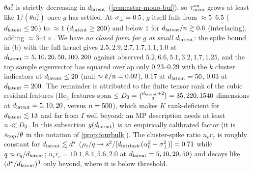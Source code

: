 \begin{proposition}
$\theta a_*^2$ is strictly decreasing in $d_{\mathrm{latent}}$ (\cref{rem:astar-mono-buf}), so $\tau_{\mathrm{mem}}^{\rm on}$ grows at least like $1/(\theta a_*^2)$ once $g$ has settled. At $\sigma_{\perp}=0.5$, $g$ itself falls from $\approx5$--$6.5$ ($d_{\mathrm{latent}}\le20$) to $\approx1$ ($d_{\mathrm{latent}}\ge200$) and below $1$ for $d_{\mathrm{latent}}/n\gtrsim0.6$ (interlacing), adding $\approx3$--$4\times$. We have \emph{no closed form for $g$ at small $d_{\mathrm{latent}}$}: the spike bound in (b) with the full kernel gives $2.5,2.9,2.7,1.7,1.1,1.0$ at $d_{\mathrm{latent}}=5,10,20,50,100,200$ against observed $5.2,6.6,5.1,3.2,1.7,1.25$, and the top sample eigenvector has squared overlap only $0.23$--$0.29$ with the $k$ cluster indicators at $d_{\mathrm{latent}}\le20$ (null $\approx k/n=0.02$), $0.17$ at $d_{\mathrm{latent}}=50$, $0.03$ at $d_{\mathrm{latent}}=200$. The remainder is attributed to the finite tensor rank of the cubic residual features ($\mathrm{He}_3$ features span $\le D_3=\binom{d_{\mathrm{latent}}+2}{3}=35,220,1540$ dimensions at $d_{\mathrm{latent}}=5,10,20$, versus $n=500$), which makes $\bar K$ rank-deficient for $d_{\mathrm{latent}}\lesssim13$ and far from $I$ well beyond; an MP description needs at least $n\ll D_3$. In this subsection $g(d_{\mathrm{latent}})$ is an empirically calibrated factor (it is $\kappa_{\rm top}/\theta$ in the notation of \cref{prop:fourbulk}). The cluster-spike ratio $n_cr_c$ is roughly constant for $d_{\mathrm{latent}}\lesssim d^\star$ ($\rho_c/q\to s^2/[d_{\mathrm{intrinsic}}(\alpha_0^2-\sigma_{\perp}^2)]=0.71$ while $q\approx c_q/d_{\mathrm{latent}}$; $n_cr_c=10.1,8.4,5.6,2.0$ at $d_{\mathrm{latent}}=5,10,20,50$) and decays like $(d^\star/d_{\mathrm{latent}})^3$ only beyond, where it is below threshold.
\end{proposition}

